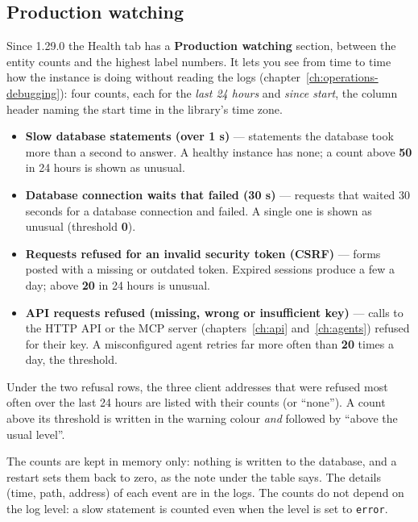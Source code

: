 \subsection*{Production watching}\label{sec:health-watch}

Since 1.29.0 the Health tab has a \textbf{Production watching}
section, between the entity counts and the highest label numbers. It lets you see
from time to time how the instance is doing without reading the logs
(chapter~\ref{ch:operations-debugging}): four counts, each for the
\emph{last 24 hours} and \emph{since start}, the column header naming
the start time in the library's time zone.

\begin{itemize}
  \item \textbf{Slow database statements (over 1 s)} — statements the
        database took more than a second to answer. A healthy instance
        has none; a count above \textbf{50} in 24 hours is shown as
        unusual.
  \item \textbf{Database connection waits that failed (30 s)} — requests
        that waited 30 seconds for a database connection and failed.
        A single one is shown as unusual (threshold \textbf{0}).
  \item \textbf{Requests refused for an invalid security token (CSRF)}
        — forms posted with a missing or outdated token. Expired
        sessions produce a few a day; above \textbf{20} in 24 hours is
        unusual.
  \item \textbf{API requests refused (missing, wrong or insufficient
        key)} — calls to the HTTP API or the MCP server
        (chapters~\ref{ch:api} and~\ref{ch:agents}) refused for their
        key. A misconfigured agent retries far more often than
        \textbf{20} times a day, the threshold.
\end{itemize}

Under the two refusal rows, the three client addresses that were
refused most often over the last 24 hours are listed with their
counts (or ``none''). A count above its threshold is written in the
warning colour \emph{and} followed by ``above the usual level''.

The counts are kept in memory only: nothing is written to the
database, and a restart sets them back to zero, as the note under the
table says. The details (time, path, address) of each event are in
the logs. The counts do not depend on the log level: a slow statement
is counted even when the level is set to \texttt{error}.

